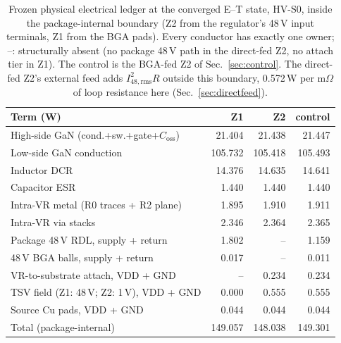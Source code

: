 \begin{table}[!t]
\caption{Frozen physical electrical ledger at the converged E--T state, HV-S0, inside the package-internal boundary (Z2 from the regulator's 48\,V input terminals, Z1 from the BGA pads). Every conductor has exactly one owner; --: structurally absent (no package 48\,V path in the direct-fed Z2, no attach tier in Z1). The control is the BGA-fed Z2 of Sec.~\ref{sec:control}. The direct-fed Z2's external feed adds $I_{48,\mathrm{rms}}^{2}R$ outside this boundary, 0.572\,W per m$\Omega$ of loop resistance here (Sec.~\ref{sec:directfeed}).}
\label{tab:ledger}
\centering
\footnotesize
\setlength{\tabcolsep}{3pt}
\begin{tabular}{@{}L{4.1cm}rrr@{}}
\toprule
Term (W) & Z1 & Z2 & control \\
\midrule
High-side GaN (cond.+sw.+gate+$C_{\mathrm{oss}}$) & 21.404 & 21.438 & 21.447 \\
Low-side GaN conduction & 105.732 & 105.418 & 105.493 \\
Inductor DCR & 14.376 & 14.635 & 14.641 \\
Capacitor ESR & 1.440 & 1.440 & 1.440 \\
Intra-VR metal (R0 traces + R2 plane) & 1.895 & 1.910 & 1.911 \\
Intra-VR via stacks & 2.346 & 2.364 & 2.365 \\
Package 48\,V RDL, supply + return & 1.802 & -- & 1.159 \\
48\,V BGA balls, supply + return & 0.017 & -- & 0.011 \\
VR-to-substrate attach, VDD + GND & -- & 0.234 & 0.234 \\
TSV field (Z1: 48\,V; Z2: 1\,V), VDD + GND & 0.000 & 0.555 & 0.555 \\
Source Cu pads, VDD + GND & 0.044 & 0.044 & 0.044 \\
\midrule
Total (package-internal) & 149.057 & 148.038 & 149.301 \\
\bottomrule
\end{tabular}
\end{table}
